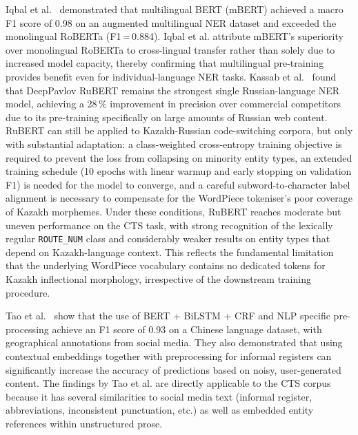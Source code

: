 Iqbal et al.~\cite{iqbal2024multilingual} demonstrated that multilingual BERT (mBERT) achieved a macro F1 score of 0.98 on an augmented multilingual NER dataset and exceeded the monolingual RoBERTa (F1\,=\,0.884). Iqbal et al. attribute mBERT's superiority over monolingual RoBERTa to cross-lingual transfer rather than solely due to increased model capacity, thereby confirming that multilingual pre-training provides benefit even for individual-language NER tasks. Kassab et al.~\cite{kassab2025russian} found that DeepPavlov RuBERT remains the strongest single Russian-language NER model, achieving a 28\,\% improvement in precision over commercial competitors due to its pre-training specifically on large amounts of Russian web content. RuBERT can still be applied to Kazakh-Russian code-switching corpora, but only with substantial adaptation: a class-weighted cross-entropy training objective is required to prevent the loss from collapsing on minority entity types, an extended training schedule (10 epochs with linear warmup and early stopping on validation F1) is needed for the model to converge, and a careful subword-to-character label alignment is necessary to compensate for the WordPiece tokeniser's poor coverage of Kazakh morphemes. Under these conditions, RuBERT reaches moderate but uneven performance on the CTS task, with strong recognition of the lexically regular \texttt{ROUTE\_NUM} class and considerably weaker results on entity types that depend on Kazakh-language context. This reflects the fundamental limitation that the underlying WordPiece vocabulary contains no dedicated tokens for Kazakh inflectional morphology, irrespective of the downstream training procedure.


Tao et al.~\cite{tao2022socialNER} show that the use of BERT + BiLSTM + CRF and NLP specific pre-processing achieve an F1 score of 0.93 on a Chinese language dataset, with geographical annotations from social media.
They also demonstrated that using contextual embeddings together with preprocessing for informal registers can significantly increase the accuracy of predictions based on noisy, user-generated content. The findings by Tao et al. are directly applicable to the CTS corpus because it has several similarities to social media text (informal register, abbreviations, inconsistent punctuation, etc.) as well as embedded entity references within unstructured prose.



